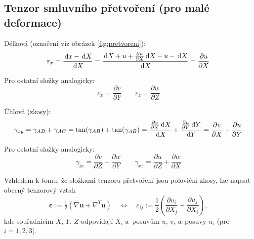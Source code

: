 
\subsection{Tenzor smluvního přetvoření (pro malé deformace)}
Délková (označení viz obrázek \ref{fig:pretvoreni}):
\begin{equation}
	\varepsilon_x
	= \frac{\,\mathrm{d} x - \,\mathrm{d} X}{\,\mathrm{d} X}
	= \frac{\,\mathrm{d} X + u + \frac{\partial u}{\partial X}\,\mathrm{d} X - u - \,\mathrm{d} X}{\,\mathrm{d} X}
	= \frac{\partial u}{\partial X}
\end{equation}

Pro ostatní složky analogicky:
\begin{equation}
	\varepsilon_x
	= \frac{\partial v}{\partial Y}
	\qquad
	\varepsilon_z
	= \frac{\partial w}{\partial Z}
\end{equation}

Úhlová (zkosy):
\begin{equation}
	\gamma_{xy}
	= \gamma_{AB} + \gamma_{AC}
	= \tan(\gamma_{AB}) + \tan(\gamma_{AB})
	= \frac{\frac{\partial v}{\partial X} \,\mathrm{d} X}{\,\mathrm{d} X}
	+ \frac{\frac{\partial u}{\partial Y} \,\mathrm{d} Y}{\,\mathrm{d} Y}
	= \frac{\partial v}{\partial X} + \frac{\partial u}{\partial Y}
\end{equation}

Pro ostatní složky analogicky:
\begin{equation}
	\gamma_{yz}
	= \frac{\partial v}{\partial Z} + \frac{\partial w}{\partial Y}
	\qquad
	\gamma_{xz}
	= \frac{\partial u}{\partial Z} + \frac{\partial w}{\partial X}
\end{equation}

Vzhledem k tomu, že složkami tenzoru přetvoření jsou poloviční zkosy, lze napsat obecný tenzorový vztah
\begin{equation}
	\bm{\varepsilon} := \tfrac{1}{2} \left( \nabla\bm{u} + \nabla^T\bm{u} \right)
	\quad\Leftrightarrow\quad
	\varepsilon_{ij} := \frac{1}{2} \left( \frac{\partial u_i}{\partial X_j} + \frac{\partial u_j}{\partial X_i} \right),
\end{equation}
kde souřadnicím $X$, $Y$, $Z$ odpovídají $X_i$ a~posuvům $u$, $v$, $w$ posuvy $u_i$ (pro $i=1,2,3$).
